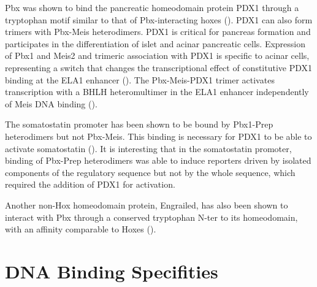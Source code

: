 
Pbx was shown to bind the pancreatic homeodomain protein PDX1 through a tryptophan motif similar to that of Pbx-interacting hoxes (\cite{Peers1995}). PDX1 can also form trimers with Pbx-Meis heterodimers. PDX1 is critical for pancreas formation and participates in the differentiation of islet and acinar pancreatic cells. Expression of Pbx1 and Meis2 and trimeric association with PDX1 is specific to acinar cells, representing a switch that changes the transcriptional effect of constitutive PDX1 binding at the ELA1 enhancer (\cite{Swift1998}). The Pbx-Meis-PDX1 trimer activates transcription with a \ac{BHLH} heteromultimer in the ELA1 enhancer independently of Meis DNA binding (\cite{Liu2001}).

The somatostatin promoter has been shown to be bound by Pbx1-Prep heterodimers but not Pbx-Meis. This binding is necessary for PDX1 to be able to activate somatostatin (\cite{Goudet1999}). It is interesting that in the somatostatin promoter, binding of Pbx-Prep heterodimers was able to induce reporters driven by isolated components of the regulatory sequence but not by the whole sequence, which required the addition of PDX1 for activation. 

Another non-Hox homeodomain protein, Engrailed, has also been shown to interact with Pbx through a conserved tryptophan \ac{N-ter} to its homeodomain, with an affinity comparable to Hoxes (\cite{Peltenburg1996}).





\section{DNA Binding Specifities}
\label{sec:specificites}
		
